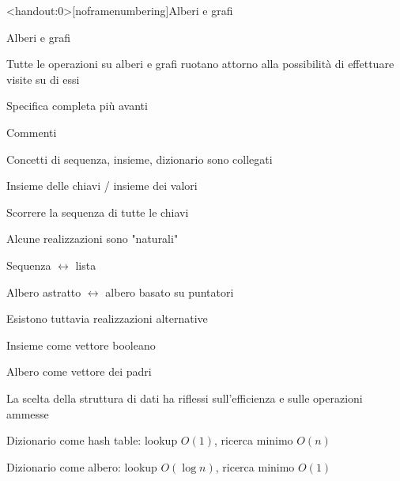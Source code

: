 \begin{frame}<handout:0>[noframenumbering]{Alberi e grafi}
\end{frame}

\begin{frame}{Alberi e grafi}

\begin{myboxtitle}[Operazioni]
\BI
\item Tutte le operazioni su alberi e grafi ruotano attorno alla possibilità di 
effettuare \alert{visite} su di essi
\item Specifica completa più avanti
\EI
\end{myboxtitle}

\end{frame}

\begin{frame}{Commenti}

\BIL
\item \alert{Concetti di sequenza, insieme, dizionario sono collegati}
\BI
\item  Insieme delle chiavi / insieme dei valori
\item  Scorrere la sequenza di tutte le chiavi
\EI
\item \alert{Alcune realizzazioni sono "naturali"}
\BI
\item Sequenza $\leftrightarrow$ lista
\item Albero astratto $\leftrightarrow$ albero basato su puntatori
\EI
\item \alert{Esistono tuttavia realizzazioni alternative}
\BI
\item Insieme come vettore booleano
\item Albero come vettore dei padri
\EI
\item \alert{La scelta della struttura di dati ha riflessi sull'efficienza e sulle operazioni ammesse}
\BI
\item Dizionario come hash table: lookup $O(1)$, ricerca minimo $O(n)$
\item Dizionario come albero: lookup $O(\log n)$, ricerca minimo $O(1)$
\EI
\EIL

\end{frame}

